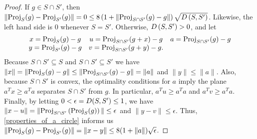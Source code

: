 
\begin{proof}


If $g \in S \cap S'$, then $\left\|{\textrm{Proj}}_S(g) - {\textrm{Proj}}_{S'}(g)\right\| = 0 \le 8\left(1 + \|{\textrm{Proj}}_{S \cap S'}(g) - g\|\right) \sqrt{{D}\left(S, S'\right)}$.
Likewise, the left hand side is $0$ whenever $S = S'$.
Otherwise, ${D}\left(S, S'\right) > 0$, and let 
\begin{align*}
\begin{array}{ccc}
x = {\textrm{Proj}}_S(g) - g      & u = {\textrm{Proj}}_{S \cap S'}(g + x) - g & a = {\textrm{Proj}}_{S \cap S'}(g) - g \\
y = {\textrm{Proj}}_{S'}(g) - g   & v = {\textrm{Proj}}_{S \cap S'}(g + y) - g. &  \\
\end{array}
\end{align*}
Because $S \cap S' \subseteq S$ and $S \cap S' \subseteq S'$ we have
$\|x\| = \|{\textrm{Proj}}_S(g) - g\| \le \|{\textrm{Proj}}_{S \cap S'} (g) - g\| = \|a\|$ and $\|y\| \le \|a\|$.
Also, because $S \cap S'$ is convex, the optimality conditions for $a$ imply the plane $a^Tx \ge a^Ta$ separates $S \cap S'$ from $g$.
In particular, $a^Tu \ge a^Ta$ and $a^Tv \ge a^Ta$.
Finally, by letting $0 < \epsilon = {D}(S, S') \le 1$, we have $\|x - u\| = \|{\textrm{Proj}}_{S \cap S'}\left({\textrm{Proj}}_S(g)\right)\| \le \epsilon$ and $\|y - v\| \le \epsilon$.
Thus, \cref{properties_of_a_circle} informs us
$\|{\textrm{Proj}}_S(g) - {\textrm{Proj}}_{S'}(g)\| = \|x - y\| \le 8(1 + \|a\|) \sqrt{\epsilon}$.
\end{proof}



